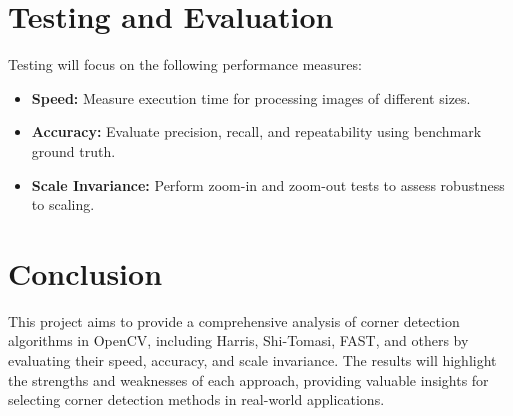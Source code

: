 \documentclass[journal]{IEEEtran}
\begin{document}
\section{Testing and Evaluation}
Testing will focus on the following performance measures:
\begin{itemize}
    \item \textbf{Speed:} Measure execution time for processing images of different sizes.
    \item \textbf{Accuracy:} Evaluate precision, recall, and repeatability using benchmark ground truth.
    \item \textbf{Scale Invariance:} Perform zoom-in and zoom-out tests to assess robustness to scaling.
\end{itemize}

\section{Conclusion}
This project aims to provide a comprehensive analysis of corner detection algorithms in OpenCV, including Harris, Shi-Tomasi, FAST, and others by evaluating their speed, accuracy, and scale invariance. The results will highlight the strengths and weaknesses of each approach, providing valuable insights for selecting corner detection methods in real-world applications.



\end{document}
